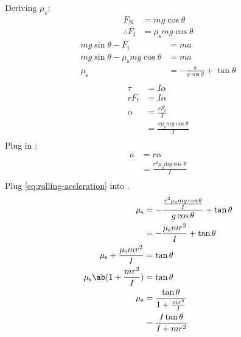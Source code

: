 Deriving \(\mu_\mathrm{s}\):
\begin{equation}
    \begin{aligned}
        F_\mathrm{N} &= m g \cos\theta \\
        \therefore F_\mathrm{f} &= \mu_\mathrm{s} m g \cos\theta
    \end{aligned}
\end{equation}
\begin{equation} \label{eq:rolling-static-friction}
    \begin{aligned}
        m g \sin\theta - F_\mathrm{f} &= m a \\
        m g \sin\theta - \mu_\mathrm{s} m g \cos\theta &= m a \\
        \mu_\mathrm{s} &= - \frac{a}{g \cos\theta} + \tan\theta \\
    \end{aligned}
\end{equation}
\begin{equation} \label{eq:rolling-angular-accleration}
    \begin{aligned}
        \tau &= I \alpha \\
        r F_\mathrm{f} &= I \alpha \\
        \alpha &= \frac{r F_\mathrm{f}}{I} \\
        &= \frac{r \mu_\mathrm{s} m g \cos\theta}{I} \\
    \end{aligned}
\end{equation}
Plug in :
\begin{equation}
    \begin{aligned} \label{eq:rolling-accleration}
        a &= r \alpha \\
        &= \frac{r^2 \mu_\mathrm{s} m g \cos\theta}{I} \\
    \end{aligned}
\end{equation}
Plug \cref{eq:rolling-accleration} into .
\begin{equation}
    \begin{aligned}
        \mu_\mathrm{s} &=
        - \frac{
            \frac{r^2 \mu_\mathrm{s} m g \cos\theta}{I}
        }
        {g \cos\theta}
        + \tan\theta \\
        &= - \frac{\mu_\mathrm{s} m r^2}{I} + \tan\theta \\
        \mu_\mathrm{s} + \frac{\mu_\mathrm{s} m r^2}{I} &= \tan\theta \\
        \mu_\mathrm{s} \ab( 1 + \frac{m r^2}{I} ) &= \tan\theta \\
        \mu_\mathrm{s} &= \frac{\tan\theta}{1 + \frac{m r^2}{I}} \\
        &= \frac{I \tan\theta}{I + m r^2}
    \end{aligned}
\end{equation}
